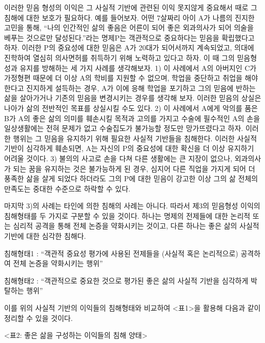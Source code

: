 이러한 믿음 형성의 이익은 그 사실적 기반에 관련된 이익 못지않게 중요해서 때로 그 침해에 대한 보호가 필요하다. 예를 들어보자. 어떤 7살짜리 아이 A가 나름의 진지한 고민을 통해, ``나의 인간적인 삶의 좋음은 어른이 되어 좋은 외과의사가 되어 의술을 베푸는 것으로만 달성된다.''라는 명제P는 객관적으로 중요하다는 믿음을 확립했다고 하자. 이러한 P의 중요성에 대한 믿음은 A가 20대가 되어서까지 계속되었고, 의대에 진학하여 열심히 의사면허를 취득하기 위해 노력하고 있다고 하자. 이 때 그의 믿음형성과 유지를 방해하는 세 가지 사례를 생각해보자. 1) 이 사례에서 A의 아버지인 C가 가정형편 때문에 더 이상 A의 학비를 지원할 수 없으며, 학업을 중단하고 취업을 해야 한다고 진지하게 설득하는 경우, A가 이에 응해 학업을 포기하고 그의 믿음에 반하는 삶을 살아가거나 기존의 믿음을 변경시키는 경우를 생각해 보자. 이러한 믿음의 상실은 나아가 삶의 전반적인 목표를 상실시킬 수도 있다. 2) 이 사례에서 A에게 악의를 품은 B가 A의 좋은 삶의 의미를 훼손시킬 목적과 고의를 가지고 수술에 필수적인 A의 손을 일상생활에는 전혀 문제가 없고 수술집도가 불가능할 정도만 망가뜨렸다고 하자. 이러한 행위는 그 믿음을 유지하기 위해 필요한 사실적 기반들을 침해한다. 이러한 사실적 기반이 심각하게 훼손되면, A는 자신의 P의 중요성에 대한 확신을 더 이상 유지하기 어려울 것이다. 3) 불의의 사고로 손을 다쳐 다른 생활에는 큰 지장이 없으나, 외과의사가 되는 꿈을 유지하는 것은 불가능하게 된 경우, 심지어 다른 직업을 가지게 되어 더 풍족한 삶을 살게 되었다 하더라도 그의 P에 대한 믿음이 강고한 이상 그의 삶 전체의 만족도는 중대한 수준으로 하락할 수 있다.

마지막 3)의 사례는 타인에 의한 침해의 사례는 아니다. 따라서 제3의 믿음형성 이익의 침해형태를 두 가지로 구분할 수 있을 것이다. 하나는 명제의 전제들에 대한 논리적 또는 심리적 공격을 통해 전체 논증을 약화시키는 것이고, 다른 하나는 좋은 삶의 사실적 기반에 대한 심각한 침해다.

침해형태1 : ``객관적 중요성 평가에 사용된 전제들을 (사실적 혹은 논리적으로) 공격하여 전체 논증을 약화시키는 행위''

침해형태2 : ``객관적으로 중요한 것으로 평가된 좋은 삶의 사실적 기반을 심각하게 박탈하는 행위''

이를 위의 사실적 기반의 이익들의 침해형태와 비교하여 \textless 표1\textgreater 을 활용해 다음과 같이 정리할 수 있을 것이다.

\textless 표2: 좋은 삶을 구성하는 이익들의 침해 양태\textgreater{}

